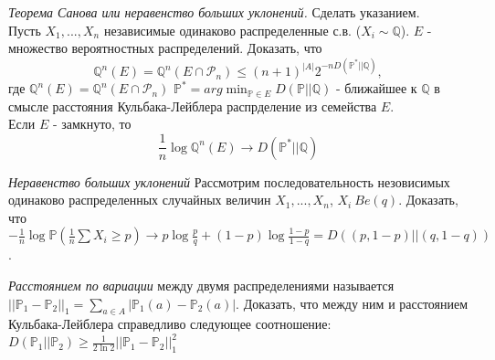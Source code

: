\begin{problem} \textit{Теорема Санова или неравенство больших уклонений.} Сделать указанием.\\
Пусть $X_1, ..., X_n$ независимые одинаково распределенные с.в. ($X_i \sim \mathbb{Q}$). $E$ - множество вероятностных распределений. Доказать, что
\begin{equation}
\mathbb{Q}^n(E) = \mathbb{Q}^n(E\cap \mathcal{P}_n) \leq (n+1)^{|A|}2^{-nD(\mathbb{P}^*||\mathbb{Q})},
\end{equation}
где $\mathbb{Q}^n(E) = \mathbb{Q}^n(E\cap \mathcal{P}_n)$ $\mathbb{P}^* = arg\min_{\mathbb{P}\in E}D(\mathbb{P}||\mathbb{Q})$ - ближайшее к $\mathbb{Q}$ в смысле расстояния Кульбака-Лейблера  распрделение из семейства $E$.\\
Если $E$ - замкнуто, то
\begin{equation}
\frac{1}{n} \log \mathbb{Q}^n(E) \rightarrow D(\mathbb{P}^*|| \mathbb{Q})
\end{equation}
\end{problem}

\begin{problem} \textit{Неравенство больших уклонений}
Рассмотрим последовательность незовисимых одинаково распределенных случайных величин $X_1, ..., X_n$, $X_i~Be(q)$. Доказать, что $-\frac{1}{n}\log \mathbb{P}(\frac{1}{n}\sum X_i \geq p) \rightarrow p\log \frac{p}{q} + (1-p)\log \frac{1-p}{1-q} = D((p, 1-p)||(q, 1-q))$.
\begin{ordre}
\end{ordre}
\end{problem}

\begin{problem} 
\textit{Расстоянием по вариации} между двумя распределениями называется $||\mathbb{P}_1 - \mathbb{P}_2||_1 = \sum_{a \in A} |\mathbb{P}_1(a) - \mathbb{P}_2(a)|$. Доказать, что между ним и расстоянием Кульбака-Лейблера справедливо следующее соотношение:\\
$D(\mathbb{P}_1||\mathbb{P}_2) \geq \frac{1}{2\ln2} ||\mathbb{P}_1 - \mathbb{P}_2||_1^2$
\end{problem}